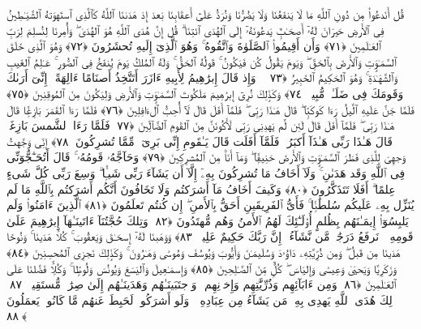  قُل أَنَدعُوا۟ مِن دُونِ ٱللَّهِ مَا لَا يَنفَعُنَا وَلَا يَضُرُّنَا وَنُرَدُّ عَلَىٰٓ أَعقَابِنَا بَعدَ إِذ هَدَىٰنَا ٱللَّهُ كَٱلَّذِى ٱستَهوَتهُ ٱلشَّيَـٰطِينُ فِى ٱلأَرضِ حَيرَانَ لَهُۥٓ أَصحَـٰبٌۭ يَدعُونَهُۥٓ إِلَى ٱلهُدَى ٱئتِنَا ۗ قُل إِنَّ هُدَى ٱللَّهِ هُوَ ٱلهُدَىٰ ۖ وَأُمِرنَا لِنُسلِمَ لِرَبِّ ٱلعَـٰلَمِينَ ﴿٧١﴾
 وَأَن أَقِيمُوا۟ ٱلصَّلَوٰةَ وَٱتَّقُوهُ ۚ وَهُوَ ٱلَّذِىٓ إِلَيهِ تُحشَرُونَ ﴿٧٢﴾
 وَهُوَ ٱلَّذِى خَلَقَ ٱلسَّمَـٰوَٟتِ وَٱلأَرضَ بِٱلحَقِّ ۖ وَيَومَ يَقُولُ كُن فَيَكُونُ ۚ قَولُهُ ٱلحَقُّ ۚ وَلَهُ ٱلمُلكُ يَومَ يُنفَخُ فِى ٱلصُّورِ ۚ عَـٰلِمُ ٱلغَيبِ وَٱلشَّهَـٰدَةِ ۚ وَهُوَ ٱلحَكِيمُ ٱلخَبِيرُ ﴿٧٣﴾
 ۞ وَإِذ قَالَ إِبرَٰهِيمُ لِأَبِيهِ ءَازَرَ أَتَتَّخِذُ أَصنَامًا ءَالِهَةً ۖ إِنِّىٓ أَرَىٰكَ وَقَومَكَ فِى ضَلَـٰلٍۢ مُّبِينٍۢ ﴿٧٤﴾
 وَكَذَٟلِكَ نُرِىٓ إِبرَٰهِيمَ مَلَكُوتَ ٱلسَّمَـٰوَٟتِ وَٱلأَرضِ وَلِيَكُونَ مِنَ ٱلمُوقِنِينَ ﴿٧٥﴾
 فَلَمَّا جَنَّ عَلَيهِ ٱلَّيلُ رَءَا كَوكَبًۭا ۖ قَالَ هَـٰذَا رَبِّى ۖ فَلَمَّآ أَفَلَ قَالَ لَآ أُحِبُّ ٱلءَافِلِينَ ﴿٧٦﴾
 فَلَمَّا رَءَا ٱلقَمَرَ بَازِغًۭا قَالَ هَـٰذَا رَبِّى ۖ فَلَمَّآ أَفَلَ قَالَ لَئِن لَّم يَهدِنِى رَبِّى لَأَكُونَنَّ مِنَ ٱلقَومِ ٱلضَّآلِّينَ ﴿٧٧﴾
 فَلَمَّا رَءَا ٱلشَّمسَ بَازِغَةًۭ قَالَ هَـٰذَا رَبِّى هَـٰذَآ أَكبَرُ ۖ فَلَمَّآ أَفَلَت قَالَ يَـٰقَومِ إِنِّى بَرِىٓءٌۭ مِّمَّا تُشرِكُونَ ﴿٧٨﴾
 إِنِّى وَجَّهتُ وَجهِىَ لِلَّذِى فَطَرَ ٱلسَّمَـٰوَٟتِ وَٱلأَرضَ حَنِيفًۭا ۖ وَمَآ أَنَا۠ مِنَ ٱلمُشرِكِينَ ﴿٧٩﴾
 وَحَآجَّهُۥ قَومُهُۥ ۚ قَالَ أَتُحَـٰٓجُّوٓنِّى فِى ٱللَّهِ وَقَد هَدَىٰنِ ۚ وَلَآ أَخَافُ مَا تُشرِكُونَ بِهِۦٓ إِلَّآ أَن يَشَآءَ رَبِّى شَيـًۭٔا ۗ وَسِعَ رَبِّى كُلَّ شَىءٍ عِلمًا ۗ أَفَلَا تَتَذَكَّرُونَ ﴿٨٠﴾
 وَكَيفَ أَخَافُ مَآ أَشرَكتُم وَلَا تَخَافُونَ أَنَّكُم أَشرَكتُم بِٱللَّهِ مَا لَم يُنَزِّل بِهِۦ عَلَيكُم سُلطَٰنًۭا ۚ فَأَىُّ ٱلفَرِيقَينِ أَحَقُّ بِٱلأَمنِ ۖ إِن كُنتُم تَعلَمُونَ ﴿٨١﴾
 ٱلَّذِينَ ءَامَنُوا۟ وَلَم يَلبِسُوٓا۟ إِيمَـٰنَهُم بِظُلمٍ أُو۟لَـٰٓئِكَ لَهُمُ ٱلأَمنُ وَهُم مُّهتَدُونَ ﴿٨٢﴾
 وَتِلكَ حُجَّتُنَآ ءَاتَينَـٰهَآ إِبرَٰهِيمَ عَلَىٰ قَومِهِۦ ۚ نَرفَعُ دَرَجَٰتٍۢ مَّن نَّشَآءُ ۗ إِنَّ رَبَّكَ حَكِيمٌ عَلِيمٌۭ ﴿٨٣﴾
 وَوَهَبنَا لَهُۥٓ إِسحَـٰقَ وَيَعقُوبَ ۚ كُلًّا هَدَينَا ۚ وَنُوحًا هَدَينَا مِن قَبلُ ۖ وَمِن ذُرِّيَّتِهِۦ دَاوُۥدَ وَسُلَيمَـٰنَ وَأَيُّوبَ وَيُوسُفَ وَمُوسَىٰ وَهَـٰرُونَ ۚ وَكَذَٟلِكَ نَجزِى ٱلمُحسِنِينَ ﴿٨٤﴾
 وَزَكَرِيَّا وَيَحيَىٰ وَعِيسَىٰ وَإِليَاسَ ۖ كُلٌّۭ مِّنَ ٱلصَّـٰلِحِينَ ﴿٨٥﴾
 وَإِسمَـٰعِيلَ وَٱليَسَعَ وَيُونُسَ وَلُوطًۭا ۚ وَكُلًّۭا فَضَّلنَا عَلَى ٱلعَـٰلَمِينَ ﴿٨٦﴾
 وَمِن ءَابَآئِهِم وَذُرِّيَّٰتِهِم وَإِخوَٟنِهِم ۖ وَٱجتَبَينَـٰهُم وَهَدَينَـٰهُم إِلَىٰ صِرَٰطٍۢ مُّستَقِيمٍۢ ﴿٨٧﴾
 ذَٟلِكَ هُدَى ٱللَّهِ يَهدِى بِهِۦ مَن يَشَآءُ مِن عِبَادِهِۦ ۚ وَلَو أَشرَكُوا۟ لَحَبِطَ عَنهُم مَّا كَانُوا۟ يَعمَلُونَ ﴿٨٨﴾
